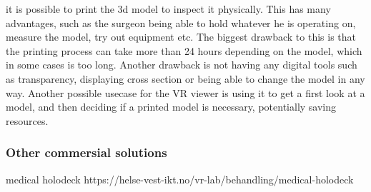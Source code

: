 \documentclass[11pt]{article}
\begin{document}
it is possible to print the 3d model to inspect it physically. This has many advantages, such as the surgeon being able to hold whatever he is operating on, measure the model, try out equipment etc. 
The biggest drawback to this is that the printing process can take more than 24 hours depending on the model, which in some cases is too long. Another drawback is not having any digital tools such as transparency, displaying cross section or being able to change the model in any way.
Another possible usecase for the VR viewer is using it to get a first look at a model, and then deciding if a printed model is necessary, potentially saving resources.

\subsubsection { Other commersial solutions }

medical holodeck https://helse-vest-ikt.no/vr-lab/behandling/medical-holodeck \cite{materialise}




\printbibliography
\end{document}
